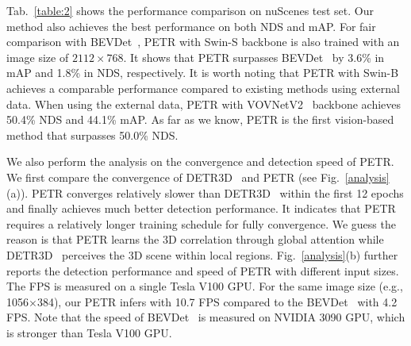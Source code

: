 \documentclass[runningheads]{llncs}
\begin{document}
Tab.~\ref{table:2} shows the performance comparison on nuScenes test set. Our method also achieves the best performance on both NDS and mAP.
For fair comparison with BEVDet~\cite{huang2021bevdet}, PETR with Swin-S backbone is also trained with an image size of  $2112\times768$. It shows that PETR surpasses BEVDet~\cite{huang2021bevdet} by 3.6\% in mAP and 1.8\% in NDS, respectively. It is worth noting that PETR with Swin-B achieves a comparable performance compared to existing methods using external data. 
When using the external data, PETR with VOVNetV2~\cite{lee2020centermask} backbone achieves 50.4\% NDS and 44.1\% mAP. As far as we know, PETR is the first vision-based method that surpasses 50.0\% NDS.

We also perform the analysis on the convergence and detection speed of PETR. We first compare the convergence of DETR3D~\cite{wang2022detr3d} and PETR (see Fig.~\ref{analysis}(a)). PETR converges relatively slower than DETR3D~\cite{wang2022detr3d} within the first 12 epochs and finally achieves much better detection performance. It indicates that PETR requires a relatively longer training schedule for fully convergence. We guess the reason is that PETR learns the 3D correlation through global attention while DETR3D~\cite{wang2022detr3d} perceives the 3D scene within local regions. Fig.~\ref{analysis}(b) further reports the detection performance and speed of PETR with different input sizes. The FPS is measured on a single Tesla V100 GPU. For the same image size (e.g., 1056$\times$384), our PETR infers with 10.7 FPS compared to the BEVDet~\cite{huang2021bevdet} with 4.2 FPS. Note that the speed of BEVDet~\cite{huang2021bevdet} is measured on NVIDIA 3090 GPU, which is stronger than Tesla V100 GPU.
\end{document}
